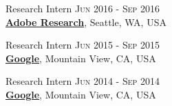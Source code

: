 \documentclass[letterpaper,10pt]{article} %
\begin{document}
Research Intern \hfill{\textsc{Jun 2016 - Sep 2016}}\\
\href{https://research.adobe.com/}{\textbf{Adobe Research}}, Seattle, WA, USA


Research Intern \hfill{\textsc{Jun 2015 - Sep 2015}}\\
\href{http://www.google.com}{\textbf{Google}}, Mountain View, CA, USA


Research Intern \hfill{\textsc{Jun 2014 - Sep 2014}}\\
\href{http://www.google.com}{\textbf{Google}}, Mountain View, CA, USA

\end{document}

